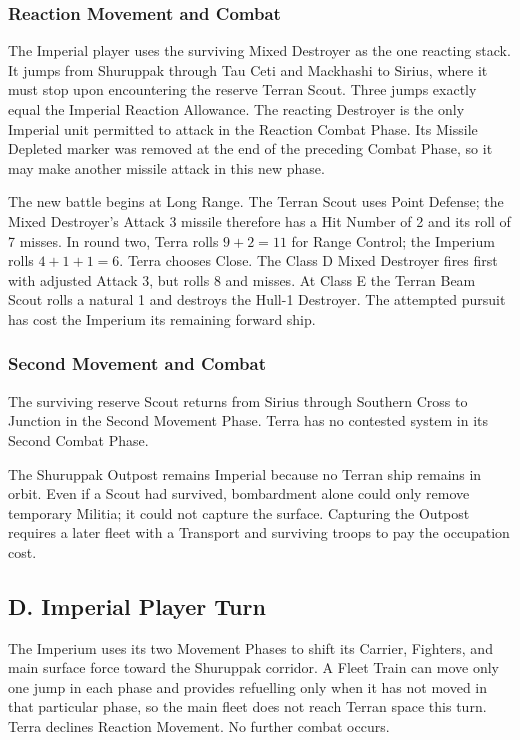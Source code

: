 \subsubsection{Reaction Movement and Combat}

The Imperial player uses the surviving Mixed Destroyer as the one reacting
stack. It jumps from Shuruppak through Tau Ceti and Mackhashi to Sirius, where
it must stop upon encountering the reserve Terran Scout. Three jumps exactly
equal the Imperial Reaction Allowance. The reacting Destroyer is the only
Imperial unit permitted to attack in the Reaction Combat Phase.
Its Missile Depleted marker was removed at the end of the preceding Combat
Phase, so it may make another missile attack in this new phase.

The new battle begins at Long Range. The Terran Scout uses Point Defense; the
Mixed Destroyer's Attack 3 missile therefore has a Hit Number of 2 and its roll
of 7 misses. In round two, Terra rolls $9+2=11$ for Range Control; the Imperium
rolls $4+1+1=6$. Terra chooses Close. The Class D Mixed Destroyer fires first
with adjusted Attack 3, but rolls 8 and misses. At Class E the Terran Beam
Scout rolls a natural 1 and destroys the Hull-1 Destroyer. The attempted
pursuit has cost the Imperium its remaining forward ship.

\subsubsection{Second Movement and Combat}

The surviving reserve Scout returns from Sirius through Southern Cross to
Junction in the Second Movement Phase. Terra has no contested system in its
Second Combat Phase.

The Shuruppak Outpost remains Imperial because no Terran ship remains in orbit.
Even if a Scout had survived, bombardment alone could only remove temporary
Militia; it could not capture the surface. Capturing the Outpost requires a
later fleet with a Transport and surviving troops to pay the occupation cost.

\subsection{D. Imperial Player Turn}

The Imperium uses its two Movement Phases to shift its Carrier, Fighters, and
main surface force toward the Shuruppak corridor. A Fleet Train can move only
one jump in each phase and provides refuelling only when it has not moved in
that particular phase, so the main fleet does not reach Terran space this
turn. Terra declines Reaction Movement. No further combat occurs.

